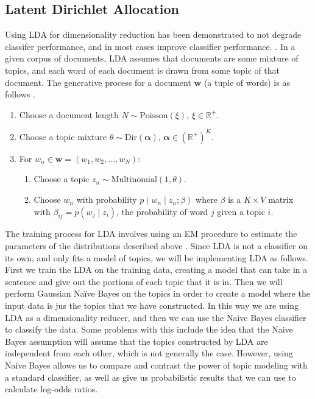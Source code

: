 \documentclass{article}
\begin{document}
\subsection{Latent Dirichlet Allocation}
Using LDA for dimensionality reduction has been demonstrated to
not degrade classifer performance, and in most cases improve classifier performance.
\cite{lda}. In a given corpus of documents, LDA assumes that documents are
some mixture of topics, and each word of each document is drawn from some
topic of that document. The generative process for a document 
$\bm{w}$ (a tuple of words) is as follows \cite{lda}.
\begin{enumerate}
    \item Choose a document length $N \sim \text{Poisson}(\xi)$, $\xi \in \mathbb{R}^+$.
    \item Choose a topic mixture $\theta \sim \text{Dir}(\bm{\alpha})$, $\bm{\alpha} \in
    (\mathbb{R}^+)^K$.
    \item For $w_n \in \bm{w} = (w_1, w_2, \ldots, w_N)$:
    \begin{enumerate}
        \item Choose a topic $z_n \sim \text{Multinomial}(1, \theta)$.
        \item Choose $w_n$ with probability $p(w_n \mid z_n; \beta)$ where $\beta$ is
        a $K \times V$ matrix with $\beta_{ij} = p(w_j \mid z_i)$, the probability of
        word $j$ given a topic $i$.
    \end{enumerate}
\end{enumerate}
The training process for LDA involves using an EM procedure to estimate the parameters 
of the distributions described above \cite{lda}. Since LDA is not a classifier on its own, and only fits a model of topics, we will be implementing LDA as follows. First we train the LDA on the training data, creating a model that can take in a sentence and give out the portions of each topic that it is in. Then we will perform Gaussian Na\"ive Bayes on the topics in order to create a model where the input data is jus the topics that we have constructed. In this way we are using LDA as a dimensionality reducer, and then we can use the Naive Bayes classifier to classify the data. Some problems with this include the idea that the Naive Bayes assumption will assume that the topics constructed by LDA are independent from each other, which is not generally the case. However, using Naive Bayes allows us to compare and contrast the power of topic modeling with a standard classifier, as well as give us probabilistic results that we can use to calculate log-odds ratios.  
\end{document}
